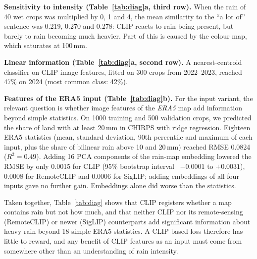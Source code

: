 \documentclass[sigconf]{acmart}
\begin{document}
\textbf{Sensitivity to intensity (Table~\ref{tab:diag}a, third row).} When the rain of 40 wet crops was
multiplied by 0, 1 and 4, the mean similarity to the ``a lot of'' sentence
was 0.219, 0.270 and 0.278: CLIP reacts to rain being present, but barely
to rain becoming much heavier. Part of this is caused by the colour map,
which saturates at 100\,mm.

\textbf{Linear information (Table~\ref{tab:diag}a, second row).} A nearest-centroid classifier on CLIP image
features, fitted on 300 crops from 2022--2023, reached 47\% on 2024 (most
common class: 42\%).

\textbf{Features of the ERA5 input (Table~\ref{tab:diag}b).} For the input variant, the relevant
question is whether image features of the \emph{ERA5} map add information
beyond simple statistics. On 1000 training and 500 validation crops, we
predicted the share of land with at least 20\,mm in CHIRPS with ridge
regression. Eighteen ERA5 statistics (mean, standard deviation, 90th
percentile and maximum of each input, plus the share of bilinear rain above
10 and 20\,mm) reached RMSE 0.0824 ($R^2 = 0.49$). Adding 16 PCA
components of the rain-map embedding lowered the RMSE by only 0.0015 for
CLIP (95\% bootstrap interval~\cite{efron1993bootstrap} $-0.0001$ to
$+0.0031$), 0.0008 for
RemoteCLIP and 0.0006 for SigLIP; adding embeddings of all four inputs gave
no further gain. Embeddings alone did worse than the statistics.

Taken together, Table~\ref{tab:diag} shows that CLIP registers whether a
map contains rain but not how much, and that neither CLIP nor its
remote-sensing (RemoteCLIP) or newer (SigLIP) counterparts add significant
information about heavy rain beyond 18 simple ERA5 statistics. A CLIP-based
loss therefore has little to reward, and any benefit of CLIP features as an
input must come from somewhere other than an understanding of rain
intensity.
\end{document}
